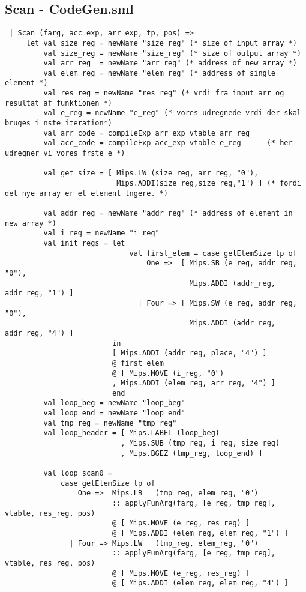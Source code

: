 \documentclass{article}
\begin{document}
\subsection{Scan - CodeGen.sml}\label{app:scan}
\begin{lstlisting}
 | Scan (farg, acc_exp, arr_exp, tp, pos) =>
     let val size_reg = newName "size_reg" (* size of input array *)
         val size_reg = newName "size_reg" (* size of output array *)
         val arr_reg  = newName "arr_reg" (* address of new array *)
         val elem_reg = newName "elem_reg" (* address of single element *)
         val res_reg = newName "res_reg" (* vrdi fra input arr og resultat af funktionen *)
         val e_reg = newName "e_reg" (* vores udregnede vrdi der skal bruges i nste iteration*)
         val arr_code = compileExp arr_exp vtable arr_reg    
         val acc_code = compileExp acc_exp vtable e_reg      (* her udregner vi vores frste e *)
         
         val get_size = [ Mips.LW (size_reg, arr_reg, "0"),
                          Mips.ADDI(size_reg,size_reg,"1") ] (* fordi det nye array er et element lngere. *)

         val addr_reg = newName "addr_reg" (* address of element in new array *)
         val i_reg = newName "i_reg"
         val init_regs = let
                             val first_elem = case getElemSize tp of
                                 One =>  [ Mips.SB (e_reg, addr_reg, "0"), 
                                           Mips.ADDI (addr_reg, addr_reg, "1") ]
                               | Four => [ Mips.SW (e_reg, addr_reg, "0"),
                                           Mips.ADDI (addr_reg, addr_reg, "4") ]
                         in
                         [ Mips.ADDI (addr_reg, place, "4") ]
                         @ first_elem
                         @ [ Mips.MOVE (i_reg, "0")
                         , Mips.ADDI (elem_reg, arr_reg, "4") ]
                         end
         val loop_beg = newName "loop_beg"
         val loop_end = newName "loop_end"
         val tmp_reg = newName "tmp_reg"
         val loop_header = [ Mips.LABEL (loop_beg)
                           , Mips.SUB (tmp_reg, i_reg, size_reg)
                           , Mips.BGEZ (tmp_reg, loop_end) ]
         
         val loop_scan0 =
             case getElemSize tp of
                 One =>  Mips.LB   (tmp_reg, elem_reg, "0")
                         :: applyFunArg(farg, [e_reg, tmp_reg], vtable, res_reg, pos)
                         @ [ Mips.MOVE (e_reg, res_reg) ]
                         @ [ Mips.ADDI (elem_reg, elem_reg, "1") ]
               | Four => Mips.LW   (tmp_reg, elem_reg, "0")
                         :: applyFunArg(farg, [e_reg, tmp_reg], vtable, res_reg, pos)
                         @ [ Mips.MOVE (e_reg, res_reg) ]
                         @ [ Mips.ADDI (elem_reg, elem_reg, "4") ]
                         

\end{lstlisting}
\end{document}
